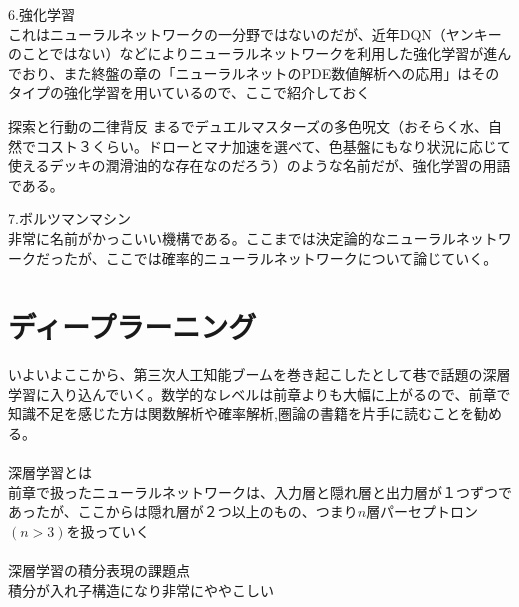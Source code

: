 \documentclass{jsarticle}
\begin{document}
6.強化学習\\
これはニューラルネットワークの一分野ではないのだが、近年DQN（ヤンキーのことではない）などによりニューラルネットワークを利用した強化学習が進んでおり、また終盤の章の「ニューラルネットのPDE数値解析への応用」はそのタイプの強化学習を用いているので、ここで紹介しておく




探索と行動の二律背反
まるでデュエルマスターズの多色呪文（おそらく水、自然でコスト３くらい。ドローとマナ加速を選べて、色基盤にもなり状況に応じて使えるデッキの潤滑油的な存在なのだろう）のような名前だが、強化学習の用語である。


7.ボルツマンマシン\\
非常に名前がかっこいい機構である。ここまでは決定論的なニューラルネットワークだったが、ここでは確率的ニューラルネットワークについて論じていく。\\


\newpage
\section{ディープラーニング}
いよいよここから、第三次人工知能ブームを巻き起こしたとして巷で話題の深層学習に入り込んでいく。数学的なレベルは前章よりも大幅に上がるので、前章で知識不足を感じた方は関数解析や確率解析,圏論の書籍を片手に読むことを勧める。\\
　\\
深層学習とは\\
前章で扱ったニューラルネットワークは、入力層と隠れ層と出力層が１つずつであったが、ここからは隠れ層が２つ以上のもの、つまり$n$層パーセプトロン$(n>3)$を扱っていく\\
　\\
深層学習の積分表現の課題点\\
積分が入れ子構造になり非常にややこしい\\
 
\end{document}
